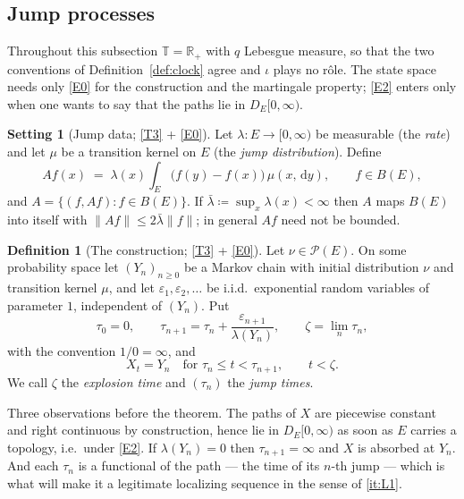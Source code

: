 \documentclass[11pt,a4paper]{article}
\theoremstyle{plain}
\theoremstyle{definition}
\newtheorem{definition}[theorem]{Definition}
\newtheorem{setting}[theorem]{Setting}
\theoremstyle{remark}
\newcommand{\R}{\mathbb{R}}
\newcommand{\Rp}{\R_+}
\newcommand{\T}{\mathbb{T}}                     %
\newcommand{\Bdd}{B}                           %
\newcommand{\Prob}{\mathcal{P}}                %
\newcommand{\DE}{D_E[0,\infty)}
\newcommand{\dif}{\,\mathrm{d}}
\begin{document}
\subsection{Jump processes}
\label{ssec:jump}

Throughout this subsection $\T = \Rp$ with $q$ Lebesgue measure, so that the two
conventions of Definition~\ref{def:clock} agree and $\iota$ plays no r\^ole.  The
state space needs only \eqref{E0} for the construction and the martingale property;
\eqref{E2} enters only when one wants to say that the paths lie in $\DE$.

\begin{setting}[Jump data; \eqref{T3} + \eqref{E0}]
  \label{set:jumpdata}
  Let $\lambda : E \to [0,\infty)$ be measurable (the \emph{rate}) and let $\mu$ be
  a transition kernel on $E$ (the \emph{jump distribution}).  Define
  \begin{equation}
    \label{eq:jumpgen}
    A f(x) \;=\; \lambda(x) \int_E \bigl( f(y) - f(x) \bigr) \, \mu(x,\dif y) ,
    \qquad f \in \Bdd(E) ,
  \end{equation}
  and $A = \{(f, Af) : f \in \Bdd(E)\}$.  If
  $\bar{\lambda} \coloneqq \sup_x \lambda(x) < \infty$ then $A$ maps $\Bdd(E)$ into
  itself with $\lVert Af \rVert \leq 2 \bar{\lambda} \lVert f \rVert$; in general
  $Af$ need not be bounded.
\end{setting}

\begin{definition}[The construction; \eqref{T3} + \eqref{E0}]
  \label{def:jumpconstruction}
  Let $\nu \in \Prob(E)$.  On some probability space let $(Y_n)_{n \geq 0}$ be a
  Markov chain with initial distribution $\nu$ and transition kernel $\mu$, and
  let $\varepsilon_1, \varepsilon_2, \dots$ be i.i.d.\ exponential random
  variables of parameter $1$, independent of $(Y_n)$.  Put
  \begin{equation}
    \label{eq:jumptimes}
    \tau_0 = 0 , \qquad
    \tau_{n+1} = \tau_n + \frac{\varepsilon_{n+1}}{\lambda(Y_n)} ,
    \qquad \zeta = \lim_n \tau_n ,
  \end{equation}
  with the convention $1/0 = \infty$, and
  \begin{equation}
    \label{eq:jumpprocess}
    X_t = Y_n \quad \text{for } \tau_n \leq t < \tau_{n+1} , \qquad t < \zeta .
  \end{equation}
  We call $\zeta$ the \emph{explosion time} and $(\tau_n)$ the \emph{jump times}.
\end{definition}

Three observations before the theorem.  The paths of $X$ are piecewise constant
and right continuous by construction, hence lie in $\DE$ as soon as $E$ carries a
topology, i.e.\ under \eqref{E2}.  If $\lambda(Y_n) = 0$ then $\tau_{n+1} = \infty$ and
$X$ is absorbed at $Y_n$.  And each $\tau_n$ is a functional of the path --- the
time of its $n$-th jump --- which is what will make it a legitimate localizing
sequence in the sense of \ref{it:L1}.
\end{document}

